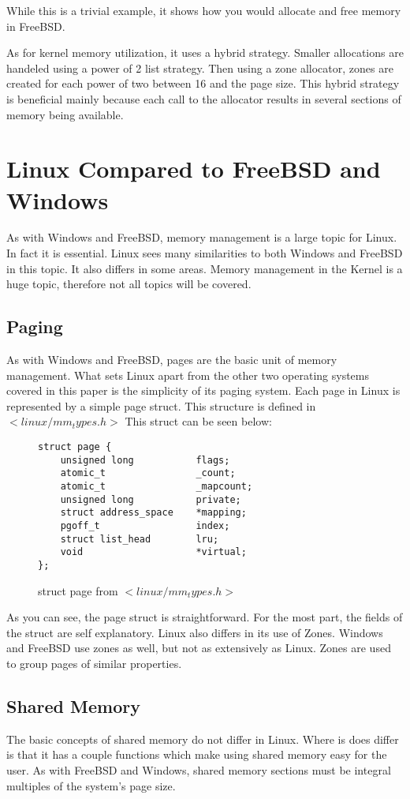\documentclass[letterpaper,10pt,titlepage,draftclsnofoot,onecolumn]{IEEEtran}
\begin{document}
While this is a trivial example, it shows how you would allocate and free memory in FreeBSD.

As for kernel memory utilization, it uses a hybrid strategy. Smaller allocations are handeled using a power of 2 list strategy. Then using a zone allocator, zones are created for each power of two between 16 and the page size. \cite{freebsd} This hybrid strategy is beneficial mainly because each call to the allocator results in several sections of memory being available.

\section{Linux Compared to FreeBSD and Windows}
As with Windows and FreeBSD, memory management is a large topic for Linux. In fact it is essential. Linux sees many similarities to both Windows and FreeBSD in this topic. It also differs in some areas. Memory management in the Kernel is a huge topic, therefore not all topics will be covered.

\subsection{Paging}
As with Windows and FreeBSD, pages are the basic unit of memory management. What sets Linux apart from the other two operating systems covered in this paper is the simplicity of its paging system. Each page in Linux is represented by a simple page struct. This structure is defined in $<linux/mm_types.h>$ This struct can be seen below:

\begin{figure}[H]
\caption{struct page from $<linux/mm_types.h>$}
\begin{lstlisting}
struct page {
	unsigned long 			flags;
	atomic_t				_count;
	atomic_t				_mapcount;
	unsigned long			private;
	struct address_space	*mapping;
	pgoff_t					index;
	struct list_head		lru;
	void					*virtual;
};
\end{lstlisting}
\cite{linux}
\end{figure}

As you can see, the page struct is straightforward. For the most part, the fields of the struct are self explanatory. Linux also differs in its use of Zones. Windows and FreeBSD use zones as well, but not as extensively as Linux. Zones are used to group pages of similar properties. \cite{linux} 

\subsection{Shared Memory}
The basic concepts of shared memory do not differ in Linux. Where is does differ is that it has a couple functions which make using shared memory easy for the user. As with FreeBSD and Windows, shared memory sections must be integral multiples of the system's page size. \cite{linux}
\end{document}
